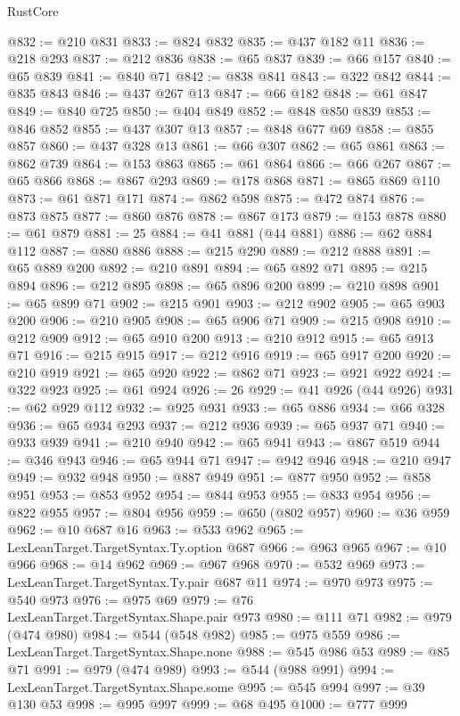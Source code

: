 \begin{lexlean}{RustCore}
\begin{coremodule}
@832 := @210 @831
@833 := @824 @832
@835 := @437 @182 @11
@836 := @218 @293
@837 := @212 @836
@838 := @65 @837
@839 := @66 @157
@840 := @65 @839
@841 := @840 @71
@842 := @838 @841
@843 := @322 @842
@844 := @835 @843
@846 := @437 @267 @13
@847 := @66 @182
@848 := @61 @847
@849 := @840 @725
@850 := @404 @849
@852 := @848 @850 @839
@853 := @846 @852
@855 := @437 @307 @13
@857 := @848 @677 @69
@858 := @855 @857
@860 := @437 @328 @13
@861 := @66 @307
@862 := @65 @861
@863 := @862 @739
@864 := @153 @863
@865 := @61 @864
@866 := @66 @267
@867 := @65 @866
@868 := @867 @293
@869 := @178 @868
@871 := @865 @869 @110
@873 := @61 @871 @171
@874 := @862 @598
@875 := @472 @874
@876 := @873 @875
@877 := @860 @876
@878 := @867 @173
@879 := @153 @878
@880 := @61 @879
@881 := 25
@884 := @41 @881 (@44 @881)
@886 := @62 @884 @112
@887 := @880 @886
@888 := @215 @290
@889 := @212 @888
@891 := @65 @889 @200
@892 := @210 @891
@894 := @65 @892 @71
@895 := @215 @894
@896 := @212 @895
@898 := @65 @896 @200
@899 := @210 @898
@901 := @65 @899 @71
@902 := @215 @901
@903 := @212 @902
@905 := @65 @903 @200
@906 := @210 @905
@908 := @65 @906 @71
@909 := @215 @908
@910 := @212 @909
@912 := @65 @910 @200
@913 := @210 @912
@915 := @65 @913 @71
@916 := @215 @915
@917 := @212 @916
@919 := @65 @917 @200
@920 := @210 @919
@921 := @65 @920
@922 := @862 @71
@923 := @921 @922
@924 := @322 @923
@925 := @61 @924
@926 := 26
@929 := @41 @926 (@44 @926)
@931 := @62 @929 @112
@932 := @925 @931
@933 := @65 @886
@934 := @66 @328
@936 := @65 @934 @293
@937 := @212 @936
@939 := @65 @937 @71
@940 := @933 @939
@941 := @210 @940
@942 := @65 @941
@943 := @867 @519
@944 := @346 @943
@946 := @65 @944 @71
@947 := @942 @946
@948 := @210 @947
@949 := @932 @948
@950 := @887 @949
@951 := @877 @950
@952 := @858 @951
@953 := @853 @952
@954 := @844 @953
@955 := @833 @954
@956 := @822 @955
@957 := @804 @956
@959 := @650 (@802 @957)
@960 := @36 @959
@962 := @10 @687 @16
@963 := @533 @962
@965 := LexLeanTarget.TargetSyntax.Ty.option @687
@966 := @963 @965
@967 := @10 @966
@968 := @14 @962
@969 := @967 @968
@970 := @532 @969
@973 := LexLeanTarget.TargetSyntax.Ty.pair @687 @11
@974 := @970 @973
@975 := @540 @973
@976 := @975 @69
@979 := @76 LexLeanTarget.TargetSyntax.Shape.pair @973
@980 := @111 @71
@982 := @979 (@474 @980)
@984 := @544 (@548 @982)
@985 := @975 @559
@986 := LexLeanTarget.TargetSyntax.Shape.none
@988 := @545 @986 @53
@989 := @85 @71
@991 := @979 (@474 @989)
@993 := @544 (@988 @991)
@994 := LexLeanTarget.TargetSyntax.Shape.some
@995 := @545 @994
@997 := @39 @130 @53
@998 := @995 @997
@999 := @68 @495
@1000 := @777 @999

\end{coremodule}
\end{lexlean}
